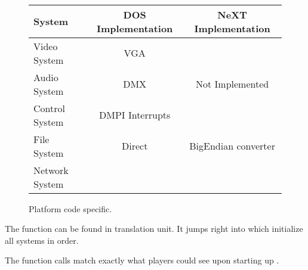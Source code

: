 \\
\par
 \begin{figure}[H]
\centering  
\begin{tabularx}{\textwidth}{ L{0.22} | C{0.39} | C{0.39} }
  \toprule
  \textbf{System} & \textbf{DOS Implementation} & \textbf{NeXT Implementation}\\
  \toprule 
    Video System & VGA &  \\
    Audio System & DMX & Not Implemented\\
    Control System & DMPI Interrupts &  \\
    File  System & Direct & BigEndian converter\\
    Network System &  &  \\
   \toprule
\end{tabularx}
\caption{Platform code specific.}
\end{figure}

\par


The  function can be found in  translation unit. It jumps right into  which initialize all systems in order.\\
\par
{}
\pagebreak

The function calls match exactly what players could see upon starting up \doom.\\
\par
{}
\par

